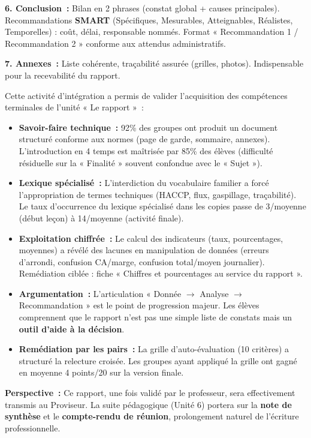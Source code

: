 \documentclass[11pt]{article}
\newcounter{popsec}
\newcounter{popsub}
\newcommand{\courssub}[1]{%
  \stepcounter{popsub}%
  \par\vspace{9pt}\noindent{\popxbold\fontsize{11.5}{13}\selectfont\color{popink}{\color{poporange}\thepopsec.\thepopsub}\hspace{6pt}#1}\par\nopagebreak\vspace{4pt}
}
\begin{document}
\begin{exoresolu}
\noindent \textbf{6. Conclusion~:} Bilan en 2 phrases (constat global + causes principales). Recommandations \textbf{SMART} (Spécifiques, Mesurables, Atteignables, Réalistes, Temporelles) : coût, délai, responsable nommés. Format « Recommandation 1 / Recommandation 2 » conforme aux attendus administratifs.

\noindent \textbf{7. Annexes~:} Liste cohérente, traçabilité assurée (grilles, photos). Indispensable pour la recevabilité du rapport.
\end{exoresolu}

\courssub{Bilan de l'activité}
\noindent Cette activité d'intégration a permis de valider l'acquisition des compétences terminales de l'unité « Le rapport »~:

\begin{itemize}
    \item \textbf{Savoir-faire technique~:} 92\% des groupes ont produit un document structuré conforme aux normes (page de garde, sommaire, annexes). L'introduction en 4 temps est maîtrisée par 85\% des élèves (difficulté résiduelle sur la « Finalité » souvent confondue avec le « Sujet »).
    \item \textbf{Lexique spécialisé~:} L'interdiction du vocabulaire familier a forcé l'appropriation de termes techniques (HACCP, flux, gaspillage, traçabilité). Le taux d'occurrence du lexique spécialisé dans les copies passe de 3/moyenne (début leçon) à 14/moyenne (activité finale).
    \item \textbf{Exploitation chiffrée~:} Le calcul des indicateurs (taux, pourcentages, moyennes) a révélé des lacunes en manipulation de données (erreurs d'arrondi, confusion CA/marge, confusion total/moyen journalier). Remédiation ciblée : fiche « Chiffres et pourcentages au service du rapport ».
    \item \textbf{Argumentation~:} L'articulation « Donnée $\rightarrow$ Analyse $\rightarrow$ Recommandation » est le point de progression majeur. Les élèves comprennent que le rapport n'est pas une simple liste de constats mais un \textbf{outil d'aide à la décision}.
    \item \textbf{Remédiation par les pairs~:} La grille d'auto-évaluation (10 critères) a structuré la relecture croisée. Les groupes ayant appliqué la grille ont gagné en moyenne 4 points/20 sur la version finale.
\end{itemize}

\noindent \textbf{Perspective~:} Ce rapport, une fois validé par le professeur, sera effectivement transmis au Proviseur. La suite pédagogique (Unité 6) portera sur la \textbf{note de synthèse} et le \textbf{compte-rendu de réunion}, prolongement naturel de l'écriture professionnelle.
\end{document}
